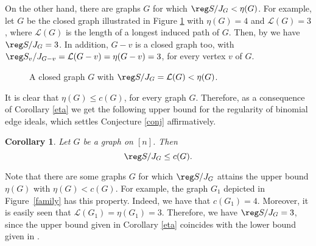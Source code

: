 \documentclass[12pt]{amsart}
\newtheorem{Corollary}[Theorem]{Corollary}
\begin{document}
On the other hand, there are graphs $G$ for which $\reg S/J_G<\eta(G)$. For example, let $G$ be the closed graph illustrated in Figure \ref{closed}  with $\eta(G)=4$ and $\mathcal{L}(G)=3$, where $\mathcal{L}(G)$ is  the length of a longest induced path of $G$. Then, by \cite[Theorem~2.2]{EZ} we have $\reg S/J_G=3$. In addition, $G-v$ is a closed graph too, with $\reg S_v/J_{G-v}=\mathcal{L}(G-v)=\eta(G-v)=3$, for every vertex $v$ of $G$.


\begin{figure}[H]
\centering
{}
\vspace{3mm}
\caption{A closed graph $G$ with $\reg S/J_G=\mathcal{L}(G)<\eta(G)$.}
\label{closed}
\end{figure}

\par \medskip It is clear that $\eta(G)\leq c(G)$, for every graph $G$. Therefore, as a consequence of Corollary \ref{eta} we get the following upper bound for the regularity of binomial edge ideals, which settles Conjecture \ref{conj} affirmatively.


\begin{Corollary}\label{cg}
Let $G$ be a graph on $[n]$. Then 
$$\reg S/J_G\leq c(G).$$
\end{Corollary}	
	
Note that there are some graphs $G$ for which $\reg S/J_G$ attains the upper bound $\eta(G)$ with $\eta(G)<c(G)$. For example, the graph $G_1$  depicted in Figure~\ref{family} has this property. Indeed, we have that $c(G_1)=4$. Moreover, it is easily seen that $\mathcal{L}(G_1)=\eta(G_1)=3$.  Therefore, we have $\reg S/J_G=3$, since the upper bound given in Corollary \ref{eta} coincides with the lower bound given in \cite[Theorem~1.1]{MM}.
\end{document}

